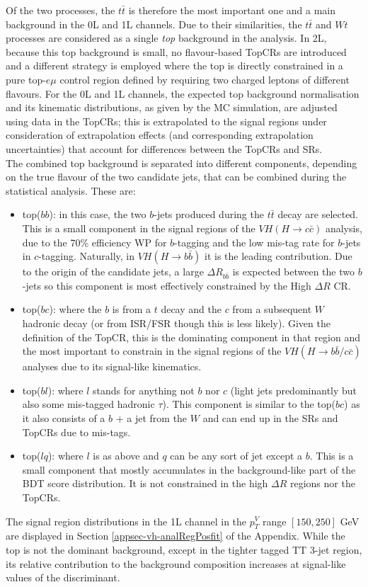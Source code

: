 Of the two processes, the $t\bar{t}$ is therefore the most important one and a main background in the 0L and 1L channels. Due to their similarities, the $t\bar{t}$ and $Wt$ processes are considered as a single \textit{top} background in the analysis. In 2L, because this top background is small, no flavour-based TopCRs are introduced and a different strategy is employed where the top is directly constrained in a pure top-$e\mu$ control region defined by requiring two charged leptons of different flavours. For the 0L and 1L channels, the expected top background normalisation and its kinematic distributions, as given by the MC simulation, are adjusted using data in the TopCRs; this is extrapolated to the signal regions under consideration of extrapolation effects (and corresponding extrapolation uncertainties) that account for differences between the TopCRs and SRs. \\

The combined top background is separated into different components, depending on the true flavour of the two candidate jets, that can be combined during the statistical analysis. These are:
\begin{itemize}
\item top($bb$): in this case, the two $b$-jets produced during the $t\bar{t}$ decay are selected. This is a small component in the signal regions of the $VH(H\rightarrow c\bar{c})$ analysis, due to the 70\% efficiency WP for $b$-tagging and the low mis-tag rate for $b$-jets in $c$-tagging. Naturally, in $VH(H\rightarrow b\bar{b})$ it is the leading contribution. Due to the origin of the candidate jets, a large $\Delta R_{b\bar{b}}$ is expected between the two $b$-jets so this component is most effectively constrained by the High $\Delta R$ CR. 
\item top($bc$): where the $b$ is from a $t$ decay and the $c$ from a subsequent $W$ hadronic decay (or from ISR/FSR though this is less likely). Given the definition of the TopCR, this is the dominating component in that region and the most important to constrain in the signal regions of the $VH(H\rightarrow b\bar{b}/c\bar{c})$ analyses due to its signal-like kinematics. 
\item top($bl$): where $l$ stands for anything not $b$ nor $c$ (light jets predominantly but also some mis-tagged hadronic $\tau$). This component is similar to the top($bc$) as it also consists of a $b$ + a jet from the $W$ and can end up in the SRs and TopCRs due to mis-tags.
\item top($lq$): where $l$ is as above and $q$ can be any sort of jet except a $b$. This is a small component that mostly accumulates in the background-like part of the BDT score distribution. It is not constrained in the high $\Delta R$ regions nor the TopCRs.
\end{itemize}
The signal region distributions in the 1L channel in the $p_T^V$ range $[150, 250]$ GeV are displayed in Section \ref{appsec-vh-analRegPosfit} of the Appendix. While the top is not the dominant background, except in the tighter tagged TT 3-jet region, its relative contribution to the background composition increases at signal-like values of the discriminant. \\

